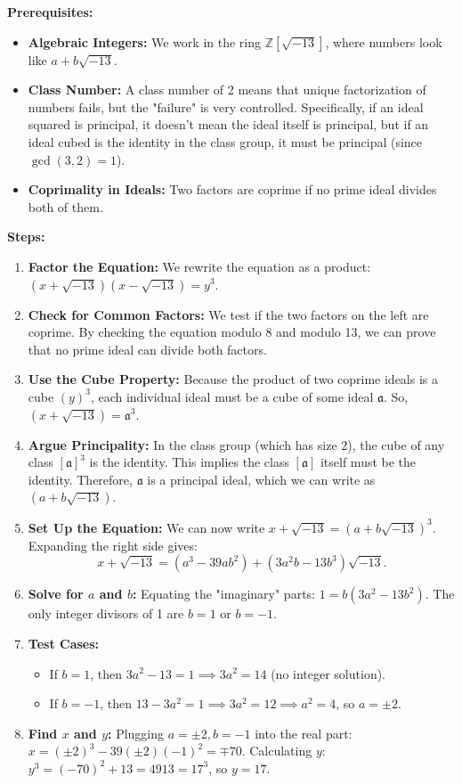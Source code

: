 \begin{solution}
\textbf{Prerequisites:}
\begin{itemize}
    \item \textbf{Algebraic Integers:} We work in the ring $\mathbb{Z}[\sqrt{-13}]$, where numbers look like $a + b\sqrt{-13}$.
    \item \textbf{Class Number:} A class number of 2 means that unique factorization of numbers fails, but the "failure" is very controlled. Specifically, if an ideal squared is principal, it doesn't mean the ideal itself is principal, but if an ideal cubed is the identity in the class group, it must be principal (since $\gcd(3, 2)=1$).
    \item \textbf{Coprimality in Ideals:} Two factors are coprime if no prime ideal divides both of them.
\end{itemize}

\textbf{Steps:}
\begin{enumerate}
    \item \textbf{Factor the Equation:} We rewrite the equation as a product: $(x + \sqrt{-13})(x - \sqrt{-13}) = y^3$.
    \item \textbf{Check for Common Factors:} We test if the two factors on the left are coprime. By checking the equation modulo 8 and modulo 13, we can prove that no prime ideal can divide both factors.
    \item \textbf{Use the Cube Property:} Because the product of two coprime ideals is a cube $(y)^3$, each individual ideal must be a cube of some ideal $\mathfrak{a}$. So, $(x + \sqrt{-13}) = \mathfrak{a}^3$.
    \item \textbf{Argue Principality:} In the class group (which has size 2), the cube of any class $[\mathfrak{a}]^3$ is the identity. This implies the class $[\mathfrak{a}]$ itself must be the identity. Therefore, $\mathfrak{a}$ is a principal ideal, which we can write as $(a + b\sqrt{-13})$.
    \item \textbf{Set Up the Equation:} We can now write $x + \sqrt{-13} = (a + b\sqrt{-13})^3$. Expanding the right side gives:
    $$x + \sqrt{-13} = (a^3 - 39ab^2) + (3a^2b - 13b^3)\sqrt{-13}.$$
    \item \textbf{Solve for $a$ and $b$:} Equating the "imaginary" parts: $1 = b(3a^2 - 13b^2)$. The only integer divisors of 1 are $b = 1$ or $b = -1$.
    \item \textbf{Test Cases:}
    \begin{itemize}
        \item If $b = 1$, then $3a^2 - 13 = 1 \implies 3a^2 = 14$ (no integer solution).
        \item If $b = -1$, then $13 - 3a^2 = 1 \implies 3a^2 = 12 \implies a^2 = 4$, so $a = \pm 2$.
    \end{itemize}
    \item \textbf{Find $x$ and $y$:} Plugging $a = \pm 2, b = -1$ into the real part: $x = (\pm 2)^3 - 39(\pm 2)(-1)^2 = \mp 70$. Calculating $y$: $y^3 = (-70)^2 + 13 = 4913 = 17^3$, so $y = 17$.
\end{enumerate}


\end{solution}
